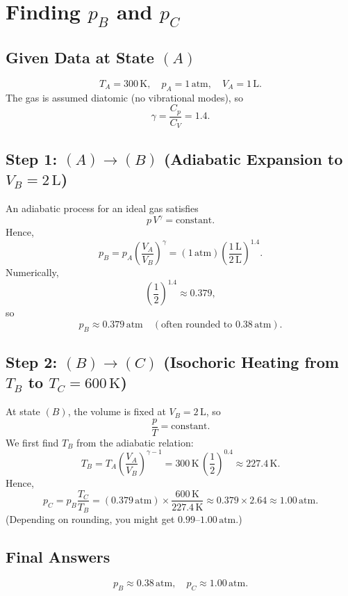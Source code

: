 \documentclass[12pt]{article}
\theoremstyle{definition} %
\theoremstyle{plain} %
\begin{document}
  \section*{Finding $p_B$ and $p_C$}

  \subsection*{Given Data at State $(A)$}
  
  \[
  T_A = 300\,\mathrm{K}, 
  \quad
  p_A = 1\,\mathrm{atm}, 
  \quad
  V_A = 1\,\mathrm{L}.
  \]
  The gas is assumed diatomic (no vibrational modes), so 
  \[
  \gamma = \frac{C_p}{C_V} = 1.4.
  \]
  
  \subsection*{Step 1: $(A)\to(B)$ (Adiabatic Expansion to $V_B=2\,\mathrm{L}$)}
  
  An adiabatic process for an ideal gas satisfies 
  \[
  p\,V^\gamma = \text{constant}.
  \]
  Hence,
  \[
  p_B = p_A \left(\frac{V_A}{V_B}\right)^\gamma 
       = (1\,\mathrm{atm})
         \left(\frac{1\,\mathrm{L}}{2\,\mathrm{L}}\right)^{1.4}.
  \]
  Numerically,
  \[
  \left(\frac{1}{2}\right)^{1.4} 
  \approx 0.379,
  \]
  so
  \[
  p_B \approx 0.379\,\mathrm{atm}
  \quad
  (\text{often rounded to }0.38\,\mathrm{atm}).
  \]
  
  \subsection*{Step 2: $(B)\to(C)$ (Isochoric Heating from $T_B$ to $T_C = 600\,\mathrm{K}$)}
  
  At state $(B)$, the volume is fixed at $V_B = 2\,\mathrm{L}$, so 
  \[
  \frac{p}{T} = \text{constant}.
  \]
  We first find $T_B$ from the adiabatic relation:
  \[
  T_B = T_A 
        \left(\frac{V_A}{V_B}\right)^{\gamma-1}
      = 300\,\mathrm{K}\,\left(\frac{1}{2}\right)^{0.4}
      \approx 227.4\,\mathrm{K}.
  \]
  Hence,
  \[
  p_C = p_B \frac{T_C}{T_B}
      = (0.379\,\mathrm{atm}) \times 
        \frac{600\,\mathrm{K}}{227.4\,\mathrm{K}}
      \approx 0.379 \times 2.64
      \approx 1.00\,\mathrm{atm}.
  \]
  (Depending on rounding, you might get $0.99$--$1.00\,\mathrm{atm}$.)
  
  \subsection*{Final Answers}
  \[
  \boxed{p_B \approx 0.38\,\mathrm{atm}, 
  \quad
  p_C \approx 1.00\,\mathrm{atm}.}
  \]
    
\end{document}
